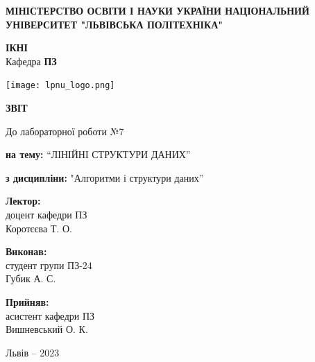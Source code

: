 \documentclass[12pt]{extarticle}
\begin{document}
\begin{titlepage}
    \begin{center}
        \textbf{\normalsize{\MakeUppercase{
            Міністерство Освіти і науки України
            Національний університет "Львівська політехніка"
        }}}

        \begin{flushright}
        \textbf{ІКНІ}\\
        Кафедра \textbf{ПЗ}
        \end{flushright}
        \vspace{15mm}

        \texttt{[image: lpnu\_logo.png]}

        \vspace*{\fill}

        \textbf{\normalsize{\MakeUppercase{Звіт}}}
            
        До лабораторної роботи №7

        \textbf{на тему:} “ЛІНІЙНІ СТРУКТУРИ ДАНИХ”

        \textbf{з дисципліни:} "Алгоритми і структури даних”
            
        \vspace*{\fill}

        \begin{flushright}

            \textbf{Лектор:}\\
            доцент кафедри ПЗ\\
            Коротєєва Т. О.\\
            \vspace{12pt}

            \textbf{Виконав:}\\
            студент групи ПЗ-24\\
            Губик А. С.\\
            \vspace{12pt}

            \textbf{Прийняв:}\\
            асистент кафедри ПЗ\\
            Вишневський О. К.\\
        \vspace{12pt}
        \end{flushright}

        Львів -- 2023
            
            
    \end{center}
\end{titlepage}
\end{document}
